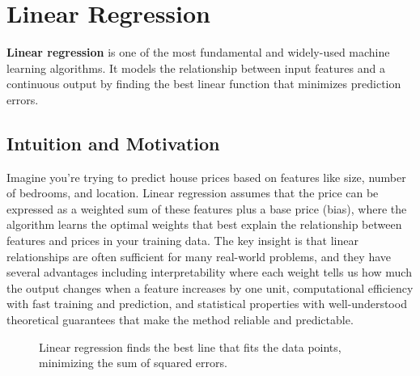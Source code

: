 
\section{Linear Regression }
\label{sec:linear-regression}

\textbf{Linear regression} is one of the most fundamental and widely-used machine learning algorithms. It models the relationship between input features and a continuous output by finding the best linear function that minimizes prediction errors.

\subsection{Intuition and Motivation}

Imagine you're trying to predict house prices based on features like size, number of bedrooms, and location. Linear regression assumes that the price can be expressed as a weighted sum of these features plus a base price (bias), where the algorithm learns the optimal weights that best explain the relationship between features and prices in your training data. The key insight is that linear relationships are often sufficient for many real-world problems, and they have several advantages including interpretability where each weight tells us how much the output changes when a feature increases by one unit, computational efficiency with fast training and prediction, and statistical properties with well-understood theoretical guarantees that make the method reliable and predictable.

\begin{figure}[htbp]
\centering
{}
\caption{Linear regression finds the best line that fits the data points, minimizing the sum of squared errors.}
\label{fig:linear-regression-example}
\end{figure}

